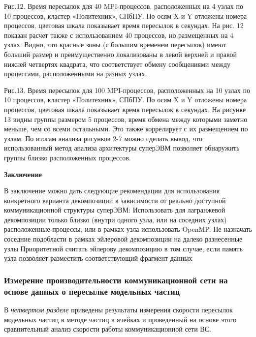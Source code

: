         Рис.12. Время пересылок для 40 MPI-процессов, расположенных на 4 узлах по 10 процессов, кластер «Политехник», СПбПУ. По осям X и Y отложены номера процессов, цветовая шкала показывает время пересылок в секундах.
        На рис. 12 показан расчет также с использованием 40 процессов, но размещенных на 4 узлах. Видно, что красные зоны (с большим временем пересылок) имеют больший размер и преимущественно локализованы в левой верхней и правой нижней четвертях квадрата, что соответствует обмену сообщениями между процессами, расположенными на разных узлах.
        
        Рис.13. Время пересылок для 100 MPI-процессов, расположенных на 10 узлах по 10 процессов, кластер «Политехник», СПбПУ. По осям X и Y отложены номера процессов, цветовая шкала показывает время пересылок в секундах.
        На рисунке 13 видны группы размером 5 процессов, время обмена между которыми заметно меньше, чем со всеми остальными. Это также коррелирует с их размещением по узлам.
        По итогам анализа рисунков 2-7 можно сделать вывод, что использованный метод анализа архитектуры суперЭВМ позволяет обнаружить группы близко расположенных процессов.
        
        
        
        
        
        
        
        \textbf{Заключение}
        
        
        В заключение можно дать следующие рекомендации для использования конкретного варианта декомпозиции в зависимости от реально доступной коммуникационной структуры суперЭВМ:
        Использовать для лагранжевой декомпозиции только близко (внутри одного узла, или на соседних узлах) расположенные процессы, или в рамках узла использовать OpenMP.
        Не назначать соседние подобласти в рамках эйлеровой декомпозиции на далеко разнесенные узлы
        Приоритетной считать эйлерову декомпозицию в том случае, если память узла позволяет разместить соответствующий фрагмент данных
        
        
		\subsubsection{Измерение производительности коммуникационной сети на основе данных о пересылке модельных частиц}
		В \textit{четвертом разделе} приведены результаты измерения скорости пересылок модельных частиц в методе частиц в ячейках и проведенный на основе этого сравнительный анализ скорости работы коммуникационной сети ВС.
		
